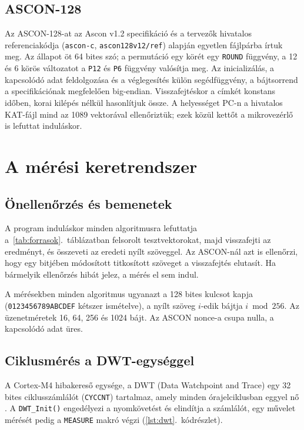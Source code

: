 \documentclass[a4paper,12pt]{report}
\theoremstyle{definition}
\theoremstyle{remark}
\begin{document}
\subsection{ASCON-128}

Az ASCON-128-at az Ascon v1.2 specifikáció \cite{Dobraunig2021} és a tervezők hivatalos referenciakódja (\texttt{ascon-c}, \texttt{ascon128v12/ref}) \cite{AsconC} alapján egyetlen fájlpárba írtuk meg. Az állapot öt 64 bites szó; a permutáció egy körét egy \texttt{ROUND} függvény, a 12 és 6 körös változatot a \texttt{P12} és \texttt{P6} függvény valósítja meg. Az inicializálás, a kapcsolódó adat feldolgozása és a véglegesítés külön segédfüggvény, a bájtsorrend a specifikációnak megfelelően big-endian. Visszafejtéskor a címkét konstans időben, korai kilépés nélkül hasonlítjuk össze. A helyességet PC-n a hivatalos KAT-fájl mind az 1089 vektorával ellenőriztük; ezek közül kettőt a mikrovezérlő is lefuttat induláskor.

\section{A mérési keretrendszer}\label{sec:keretrendszer}

\subsection{Önellenőrzés és bemenetek}

A program induláskor minden algoritmusra lefuttatja a~\ref{tab:forrasok}.~táblázatban felsorolt tesztvektorokat, majd visszafejti az eredményt, és összeveti az eredeti nyílt szöveggel. Az ASCON-nál azt is ellenőrzi, hogy egy bitjében módosított titkosított szöveget a visszafejtés elutasít. Ha bármelyik ellenőrzés hibát jelez, a mérés el sem indul.

A mérésekben minden algoritmus ugyanazt a 128 bites kulcsot kapja (\texttt{0123456789ABCDEF} kétszer ismételve), a nyílt szöveg $i$-edik bájtja $i \bmod 256$. Az üzenetméretek 16, 64, 256 és 1024 bájt. Az ASCON nonce-a csupa nulla, a kapcsolódó adat üres.

\subsection{Ciklusmérés a DWT-egységgel}

A Cortex-M4 hibakereső egysége, a DWT (Data Watchpoint and Trace) egy 32 bites ciklusszámlálót (\texttt{CYCCNT}) tartalmaz, amely minden órajelciklusban eggyel nő \cite{ARMCM4}. A \texttt{DWT\_Init()} engedélyezi a nyomkövetést és elindítja a számlálót, egy művelet mérését pedig a \texttt{MEASURE} makró végzi (\ref{lst:dwt}.~kódrészlet).
\end{document}
